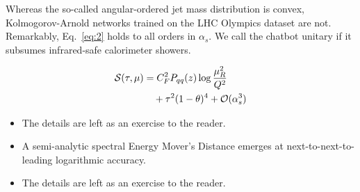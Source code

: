 Whereas the so-called angular-ordered jet mass distribution is convex,
Kolmogorov-Arnold networks trained on the LHC Olympics dataset are not.
Remarkably, Eq.~\eqref{eq:2} holds to all orders in $\alpha_s$. We call
the chatbot unitary if it subsumes infrared-safe calorimeter showers.

\begin{align}
  \mathcal{S}(\tau, \mu) &= C_F^2 P_{qq}(z) \log\frac{\mu_R^2}{Q^2} \nonumber \\
  &\quad + {\tau}^{2} (1 - \theta)^{4} + \mathcal{O}(\alpha_s^3) \label{eq:3}
\end{align}

\begin{itemize}
  \item The details are left as an exercise to the reader.
  \item A semi-analytic spectral Energy Mover's Distance emerges at next-to-next-to-leading logarithmic accuracy.
  \item The details are left as an exercise to the reader.
\end{itemize}

